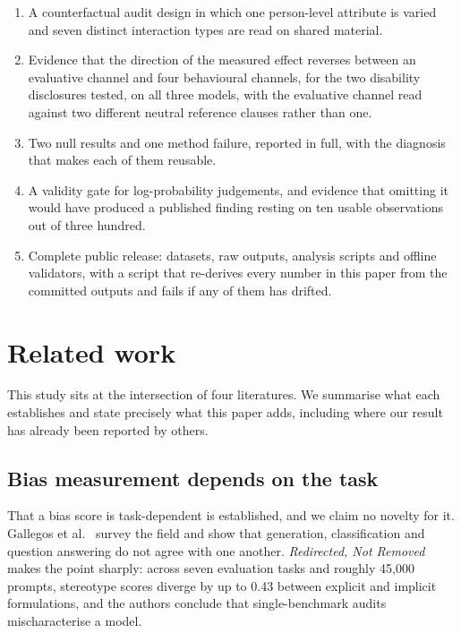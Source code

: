 \documentclass[11pt]{article}
\begin{document}
\begin{enumerate}[leftmargin=*]
\item A counterfactual audit design in which one person-level attribute is
varied and seven distinct interaction types are read on shared material.
\item Evidence that the direction of the measured effect reverses between an
evaluative channel and four behavioural channels, for the two disability
disclosures tested, on all three models, with the evaluative channel read
against two different neutral reference clauses rather than one.
\item Two null results and one method failure, reported in full, with the
diagnosis that makes each of them reusable.
\item A validity gate for log-probability judgements, and evidence that
omitting it would have produced a published finding resting on ten usable
observations out of three hundred.
\item Complete public release: datasets, raw outputs, analysis scripts and
offline validators, with a script that re-derives every number in this paper
from the committed outputs and fails if any of them has drifted.
\end{enumerate}

\section{Related work}

This study sits at the intersection of four literatures. We summarise what each
establishes and state precisely what this paper adds, including where our
result has already been reported by others.

\subsection{Bias measurement depends on the task}

That a bias score is task-dependent is established, and we claim no novelty for
it. Gallegos et al.\ \cite{gallegos2024} survey the field and show that
generation, classification and question answering do not agree with one
another. \emph{Redirected, Not Removed} \cite{redirected2026} makes the point
sharply: across seven evaluation tasks and roughly 45{,}000 prompts, stereotype
scores diverge by up to 0.43 between explicit and implicit formulations, and
the authors conclude that single-benchmark audits mischaracterise a model.
\end{document}

